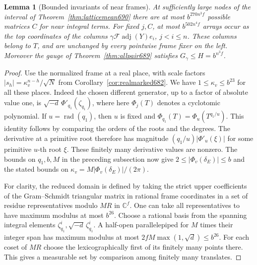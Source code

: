 \documentclass[a4paper,11pt]{article}
\newtheorem{lemma}[proposition]{Lemma}
\theoremstyle{definition}
\theoremstyle{remark}
\numberwithin{equation}{section}
\begin{document}
\begin{lemma}[Bounded invariants of near frames]\leavevmode
\label{lem:frameheight691}
At sufficiently large nodes of the interval of
Theorem~\ref{thm:latticemean690} there are at most
\(b^{270n^3 f}\) possible matrices \(C\) for near integral
terms. For fixed \(j,C\), at most \(b^{502n^4 f}\) arrays occur
as the top coordinates of the columns
\(\gamma\mathcal F\operatorname{adj}(Y)e_i\), \(j<i\le n\).
These columns belong to \(T\), and are unchanged by every
pointwise frame fixer on the left. Moreover the gauge of
Theorem~\ref{thm:allpair689} satisfies \(G_\gamma\le H=b^{n^3 f}\).
\end{lemma}
\begin{proof}
Use the normalized frame at a real place, with scale factors
\(|s_h|=\kappa_v^{n-h}/\sqrt N\) from
Corollary~\ref{cor:realmarked682}. We have
\(1\le\kappa_v\le b^{23}\) for all these places. Indeed the
chosen different generator, up to a factor of absolute value
one, is \(\sqrt{-d}\,\Phi'_{q_1}(\zeta_{q_1})\), where here
\(\Phi_j(T)\) denotes a cyclotomic polynomial. If
\(u=\operatorname{rad}(q_1)\), then \(u\) is fixed and
\(\Phi_{q_1}(T)=\Phi_u(T^{q_1/u})\). This identity follows by
comparing the orders of the roots and the degrees. The
derivative at a primitive root therefore has magnitude
\((q_1/u)|\Phi'_u(\xi)|\) for some primitive \(u\)-th root
\(\xi\). These finitely many derivative values are nonzero.
The bounds on \(q_1,b,M\) in the preceding subsection now
give \(2\le|\Phi_v(\delta_E)|\le b\) and the stated bounds
on \(\kappa_v=M|\Phi_v(\delta_E)|/(2\pi)\).

For clarity, the reduced domain is defined by taking the
strict upper coefficients of the Gram--Schmidt triangular
matrix in rational frame coordinates in a set of residue
representatives modulo \(MR\) in \(\mathbb C^f\). One can
take all representatives to have maximum modulus at most
\(b^{26}\). Choose a rational basis from the spanning
integral elements \(\zeta_{q_1}^i,\sqrt{-d}\,\zeta_{q_1}^i\).
A half-open parallelepiped for \(M\) times their integer span
has maximum modulus at most \(2fM\max(1,\sqrt d)\le b^{26}\).
For each coset of \(MR\) choose the lexicographically first
of its finitely many points there. This gives a measurable
set by comparison among finitely many translates.


\end{proof}
\end{document}
